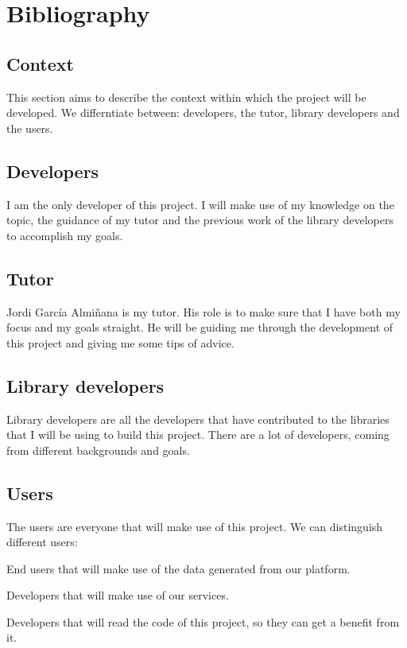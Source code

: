 
\section{Bibliography}

\subsection{Context}

This section aims to describe the context within which the project will be
developed. We differntiate between: developers, the tutor, library developers
and the users.

\subsection{Developers}

I am the only developer of this project. I will make use of my knowledge on the
topic, the guidance of my tutor and the previous work of the library developers
to accomplish my goals.

\subsection{Tutor}

Jordi García Almiñana is my tutor. His role is to make sure that I
have both my focus and my goals straight. He will be guiding me through the
development of this project and giving me some tips of advice.

\subsection{Library developers}

Library developers are all the developers that have contributed to the
libraries that I will be using to build this project. There are a lot of
developers, coming from different backgrounds and goals.

\subsection{Users}

The users are everyone that will make use of this project. We can distinguish
different users:

\mylist
\item End users that will make use of the data generated from our platform.
\item Developers that will make use of our services.
\item Developers that will read the code of this project, so they can get a
benefit from it.
\mylistend

